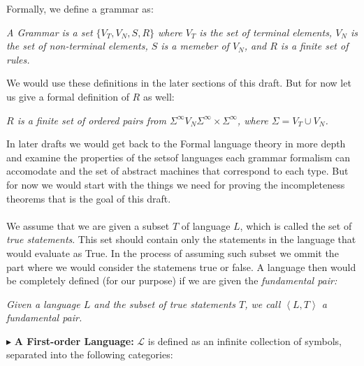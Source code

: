 \documentclass[9pt,a4paper,twocolumn]{article}
\newcounter{theo}
\newcommand{\newpoint}[1]{\indent$\blacktriangleright$ \textbf{#1}}
\newcommand{\curveL}{\mathcal{L}}
\begin{document}
                    Formally, we define a grammar as:
                    \begin{define}
                        \textit{A Grammar is a set $\{V_T,V_N,S, R\}$ where $V_T$ is the set of terminal elements, $V_N$ is the set of non-terminal elements, $S$ is a memeber of $V_N$, and $R$ is a finite set of rules.}
                    \end{define}
                    We would use these definitions in the later sections of this draft. But for now let us give a formal definition of $R$ as well:
                    \begin{define}
                        \textit{$R$ is a finite set of ordered pairs from $\Sigma^\infty V_N \Sigma^\infty\times \Sigma^\infty$, where $\Sigma = V_T\cup V_N$.}
                    \end{define}
                    In later drafts we would get back to the Formal language theory in more depth and examine the properties of the setsof languages each grammar formalism can accomodate and the set of abstract machines that correspond to each type. But for now we would start with the things we need for proving the incompleteness theorems that is the goal of this draft.
                    \\
                    \\
                    We assume that we are given a subset $T$ of language $L$, which is called the set of \textit{true statements}. This set should contain only the statements in the language that would evaluate as True. In the process of assuming such subset we ommit the part where we would consider the statemens true or false. A language then would be completely defined (for our purpose) if we are given the \textit{fundamental pair:}
                    \begin{define}
                        \textit{Given a language $L$ and the subset of true statements $T$, we call $\left<L,T\right>$ a fundamental pair.}
                    \end{define}
                    \newpoint{A First-order Language:} $\curveL$ is defined as an infinite collection of symbols, separated into the following categories:
\end{document}
